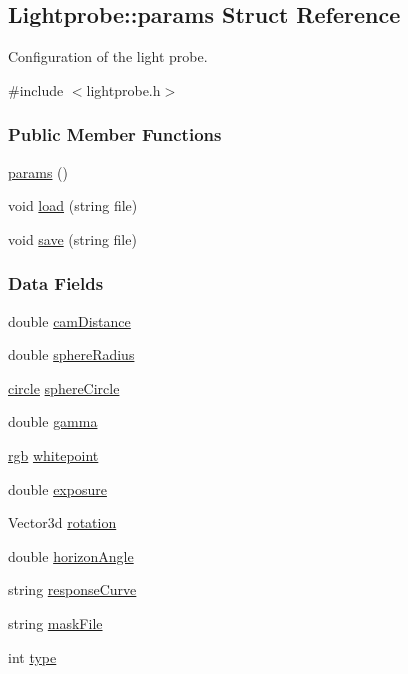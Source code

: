\hypertarget{structLightprobe_1_1params}{\subsection{\-Lightprobe\-:\-:params \-Struct \-Reference}
\label{structLightprobe_1_1params}
}


\-Configuration of the light probe.  




{\ttfamily \#include $<$lightprobe.\-h$>$}

\subsubsection*{\-Public \-Member \-Functions}
\begin{DoxyCompactItemize}
\item 
\hyperlink{structLightprobe_1_1params_a347fa0f6a9b39bffe67cd0ec7aef10fb}{params} ()
\item 
void \hyperlink{structLightprobe_1_1params_a53a42706621d09f9f8425e530e75a4bb}{load} (string file)
\item 
void \hyperlink{structLightprobe_1_1params_a66c374957c19b4e7dec7c4db52da6d50}{save} (string file)
\end{DoxyCompactItemize}
\subsubsection*{\-Data \-Fields}
\begin{DoxyCompactItemize}
\item 
double \hyperlink{structLightprobe_1_1params_a1a40e9d1a193fe336b474170c5533b64}{cam\-Distance}
\item 
double \hyperlink{structLightprobe_1_1params_ac8ab0a15e712949c6826b9e7f8a12b01}{sphere\-Radius}
\item 
\hyperlink{structcircle}{circle} \hyperlink{structLightprobe_1_1params_a44ffbf9ece76217468bffd79aab5cff1}{sphere\-Circle}
\item 
double \hyperlink{structLightprobe_1_1params_a188ea2369fb3f908e768cdcae93b11da}{gamma}
\item 
\hyperlink{structrgb}{rgb} \hyperlink{structLightprobe_1_1params_a70ece8306fa1403868ec00f9eb5a1127}{whitepoint}
\item 
double \hyperlink{structLightprobe_1_1params_ac2ffd114db0a34902f8b5ea685284418}{exposure}
\item 
\-Vector3d \hyperlink{structLightprobe_1_1params_a350177e1cf207849d610e05a9e1519f5}{rotation}
\item 
double \hyperlink{structLightprobe_1_1params_ac11dff747b25a1afbafa8a606b17adab}{horizon\-Angle}
\item 
string \hyperlink{structLightprobe_1_1params_a326b53e98cb82cc98b035563ea24a202}{response\-Curve}
\item 
string \hyperlink{structLightprobe_1_1params_aa43a9ea2e25549878c90b8be9d48fa4a}{mask\-File}
\item 
int \hyperlink{structLightprobe_1_1params_ab0c81bf7acce654fa389579d66cb4a65}{type}
\end{DoxyCompactItemize}


